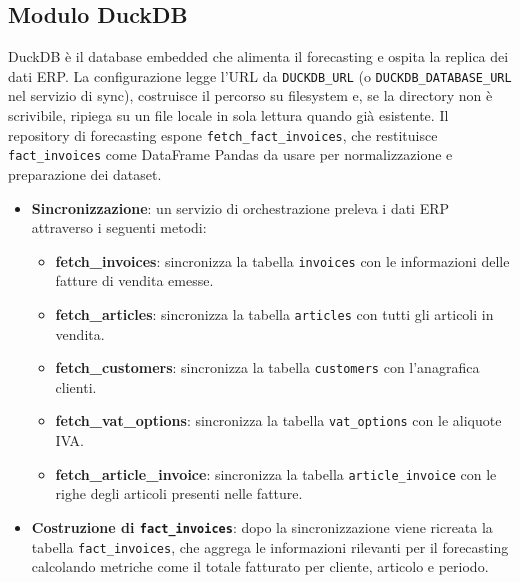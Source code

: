 \subsection{Modulo DuckDB}
DuckDB è il database embedded che alimenta il forecasting e ospita la replica dei dati ERP. La configurazione legge l’URL da \texttt{DUCKDB\_URL} (o \texttt{DUCKDB\_DATABASE\_URL} nel servizio di sync), costruisce il percorso su filesystem e, se la directory non è scrivibile, ripiega su un file locale in sola lettura quando già esistente. Il repository di forecasting espone \texttt{fetch\_fact\_invoices}, che restituisce \texttt{fact\_invoices} come DataFrame Pandas da usare per normalizzazione e preparazione dei dataset.
\begin{itemize}
    \item \textbf{Sincronizzazione}: un servizio di orchestrazione preleva i dati ERP attraverso i seguenti metodi:
    \begin{itemize}
        \item \textbf{fetch\_invoices}: sincronizza la tabella \texttt{invoices} con le informazioni delle fatture di vendita emesse.
        \item \textbf{fetch\_articles}: sincronizza la tabella \texttt{articles} con tutti gli articoli in vendita.
        \item \textbf{fetch\_customers}: sincronizza la tabella \texttt{customers} con l’anagrafica clienti.
        \item \textbf{fetch\_vat\_options}: sincronizza la tabella \texttt{vat\_options} con le aliquote IVA.
        \item \textbf{fetch\_article\_invoice}: sincronizza la tabella \texttt{article\_invoice} con le righe degli articoli presenti nelle fatture.
    \end{itemize}
    \item \textbf{Costruzione di \texttt{fact\_invoices}}: dopo la sincronizzazione viene ricreata la tabella \texttt{fact\_invoices}, che aggrega le informazioni rilevanti per il forecasting calcolando metriche come il totale fatturato per cliente, articolo e periodo.
\end{itemize}

